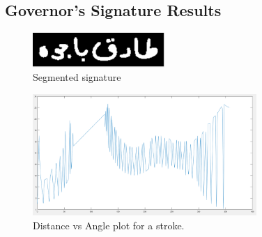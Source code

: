 \documentclass{article}
\begin{document}
\subsection{Governor’s Signature Results}
\begin{figure}[h!]

\begin{minipage}[b]{1.0\linewidth}
  \centering
  \centerline{\includegraphics[width=5cm]{g1.png}}
  \vspace{-3mm}
\end{minipage}
%
\caption{Segmented signature}
\label{fig:g1}
\vspace{-3mm}
\end{figure}

\begin{figure}[h!]

\begin{minipage}[b]{1.0\linewidth}
  \centering
  \centerline{\includegraphics[width=8.5cm]{g2.png}}
  \vspace{-3mm}
\end{minipage}
%
\caption{Distance vs Angle plot for a stroke.}
\label{fig:g2}
\vspace{-3mm}
\end{figure}
\end{document}
